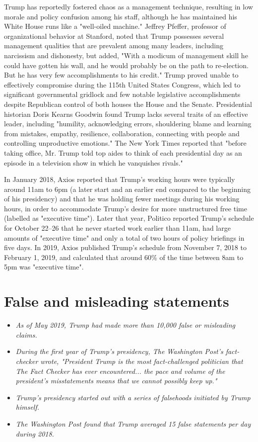 Trump has reportedly fostered chaos as a management technique, resulting
in low morale and policy confusion among his staff, although he has
maintained his White House runs like a "well-oiled machine." Jeffrey
Pfeffer, professor of organizational behavior at Stanford, noted that
Trump possesses several management qualities that are prevalent among
many leaders, including narcissism and dishonesty, but added, "With a
modicum of management skill he could have gotten his wall, and he would
probably be on the path to re-election. But he has very few
accomplishments to his credit." Trump proved unable to effectively
compromise during the 115th United States Congress, which led to
significant governmental gridlock and few notable legislative
accomplishments despite Republican control of both houses the House and
the Senate. Presidential historian Doris Kearns Goodwin found Trump
lacks several traits of an effective leader, including "humility,
acknowledging errors, shouldering blame and learning from mistakes,
empathy, resilience, collaboration, connecting with people and
controlling unproductive emotions." The New York Times reported that
"before taking office, Mr. Trump told top aides to think of each
presidential day as an episode in a television show in which he
vanquishes rivals."

In January 2018, Axios reported that Trump's working hours were
typically around 11am to 6pm (a later start and an earlier end compared
to the beginning of his presidency) and that he was holding fewer
meetings during his working hours, in order to accommodate Trump's
desire for more unstructured free time (labelled as "executive time").
Later that year, Politico reported Trump's schedule for October 22--26
that he never started work earlier than 11am, had large amounts of
"executive time" and only a total of two hours of policy briefings in
five days. In 2019, Axios published Trump's schedule from November 7,
2018 to February 1, 2019, and calculated that around 60\% of the time
between 8am to 5pm was "executive time".

\section{False and misleading
statements}\label{false-and-misleading-statements}

\begin{itemize}
\item
  \emph{As of May 2019, Trump had made more than 10,000 false or
  misleading claims.}
\item
  \emph{During the first year of Trump's presidency, The Washington
  Post's fact-checker wrote, "President Trump is the most
  fact-challenged politician that The Fact Checker has ever
  encountered... the pace and volume of the president's misstatements
  means that we cannot possibly keep up."}
\item
  \emph{Trump's presidency started out with a series of falsehoods
  initiated by Trump himself.}
\item
  \emph{The Washington Post found that Trump averaged 15 false
  statements per day during 2018.}
\end{itemize}

